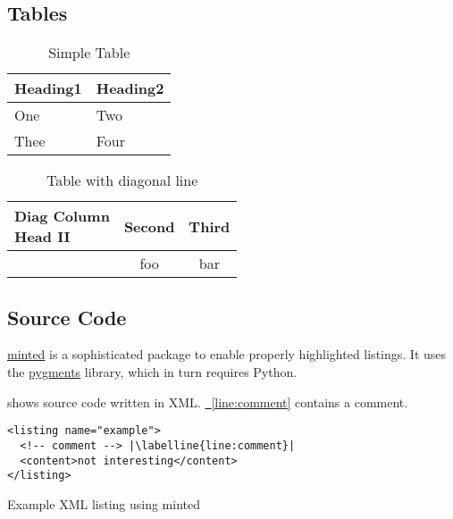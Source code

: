 \documentclass[runningheads,a4paper,english]{llncs}[2022/01/12]
\newcommand{\labelline}[1]{\label[line]{#1}\hypertarget{#1}{}}
\newcommand{\refline}[1]{\hyperlink{#1}{\FancyVerbLineautorefname~\ref*{#1}}}
\begin{document}
\subsection{Tables}

\begin{ltgexample}
\begin{table}
  \caption{Simple Table}
  \label{tab:simple}
  \centering
  \begin{tabular}{ll}
    \toprule
    Heading1 & Heading2 \\
    \midrule
    One      & Two      \\
    Thee     & Four     \\
    \bottomrule
  \end{tabular}
\end{table}
\end{ltgexample}

\begin{ltgexample}
\begin{table}
\caption{Table with diagonal line}
\label{tab:diag}
\begin{center}
\begin{tabular}{|l|c|c|}
\hline
\diagbox[width=10em]{Diag\\Column Head I}{Diag Column\\Head II} & Second & Third \\
\hline
& foo & bar \\
\hline
\end{tabular}
\end{center}
\end{table}
\end{ltgexample}


\subsection{Source Code}

\href{https://github.com/gpoore/minted}{minted} is a sophisticated package to enable properly highlighted listings.
It uses the \href{http://pygments.org/}{pygments} library, which in turn requires Python.

\begin{ltgexample}
 shows source code written in XML.
\refline{line:comment} contains a comment.

\begin{listing}[htbp]
    \begin{verbatim}
<listing name="example">
  <!-- comment --> |\labelline{line:comment}|
  <content>not interesting</content>
</listing>
\end{verbatim}
  \caption{Example XML listing using minted}
  \label{lst:XML}
\end{listing}
\end{ltgexample}
\end{document}

